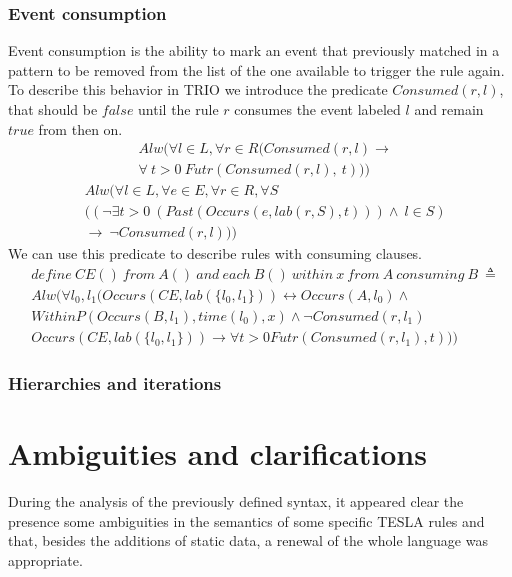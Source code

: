 \subsubsection{Event consumption}
Event consumption is the ability to mark an event that previously matched in a pattern to be removed from the list of the one available to trigger the rule again. To describe this behavior in TRIO we introduce the predicate $Consumed(r, l)$, that should be $false$ until the rule $r$ consumes the event labeled $l$ and remain $true$ from then on.
\begin{align*}
&Alw(\forall l \in L, \forall r \in R (Consumed(r, l) \rightarrow\\
&\forall\ t > 0\ Futr(Consumed(r, l),\ t)))
\end{align*}
\begin{align*}
&Alw(\forall l \in L, \forall e \in E, \forall r \in R, \forall S\\
&((\neg \exists t > 0\ (Past(Occurs(e, lab(r, S),t))) \wedge\ l \in S)\\
&\rightarrow\ \neg Consumed(r, l)))
\end{align*}
We can use this predicate to describe rules with consuming clauses.
\begin{align*}
&define\ CE()\ from\ A()\ and\ each\ B()\ within\ x\ from\ A\ consuming\ B\ \triangleq\\
&Alw(\forall l_0, l_1 (Occurs(CE, lab(\{l_0, l_1\})) \leftrightarrow Occurs(A, l_0) \wedge\\
&WithinP(Occurs(B, l_1), time(l_0), x) \wedge \neg Consumed(r, l_1)\\
&Occurs(CE, lab(\{l_0, l_1\})) \rightarrow \forall t > 0 Futr(Consumed(r, l_1), t)))
\end{align*}

\subsubsection{Hierarchies and iterations}

\section{Ambiguities and clarifications}

During the analysis of the previously defined syntax, it appeared clear the presence some ambiguities in the semantics of some specific TESLA rules and that, besides the additions of static data, a renewal of the whole language was appropriate.

